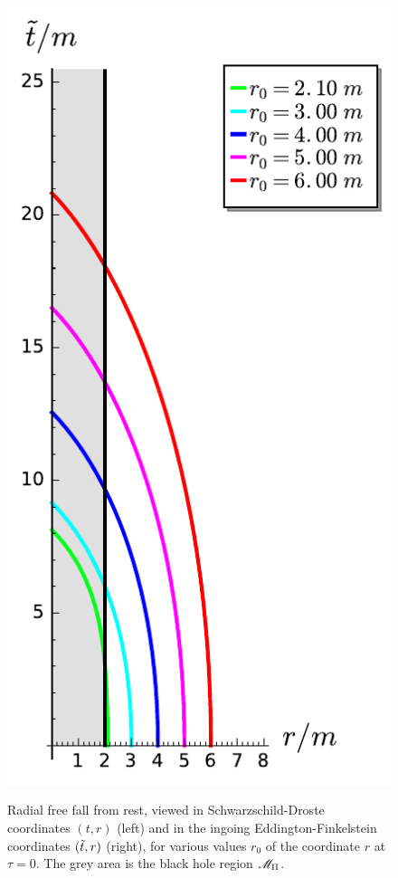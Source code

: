 \begin{figure}
{\includegraphics[height=0.5\textheight]{ges_radial_infall_IEF.pdf}}
\caption[]{\label{f:ges:radial_infall} \footnotesize
Radial free fall from rest, viewed in Schwarzschild-Droste coordinates $(t,r)$
(left) and in the ingoing Eddington-Finkelstein coordinates $({\tilde t},r)$ (right),
for various values $r_0$ of the coordinate $r$ at $\tau=0$. The grey area is the
black hole region $\mathscr{M}_{\rm II}$.}
\end{figure}


